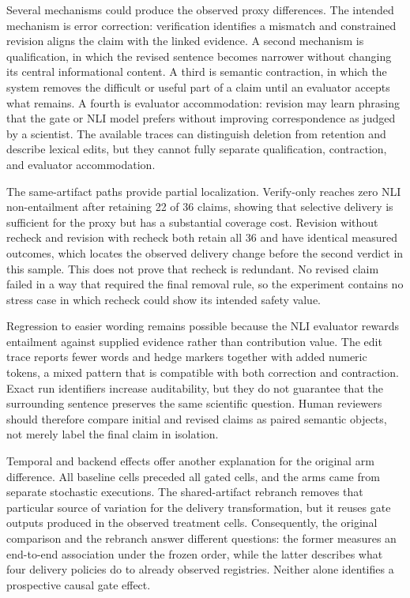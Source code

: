 \documentclass[11pt]{article}
\begin{document}
Several mechanisms could produce the observed proxy differences. The intended mechanism is error correction: verification identifies a mismatch and constrained revision aligns the claim with the linked evidence. A second mechanism is qualification, in which the revised sentence becomes narrower without changing its central informational content. A third is semantic contraction, in which the system removes the difficult or useful part of a claim until an evaluator accepts what remains. A fourth is evaluator accommodation: revision may learn phrasing that the gate or NLI model prefers without improving correspondence as judged by a scientist. The available traces can distinguish deletion from retention and describe lexical edits, but they cannot fully separate qualification, contraction, and evaluator accommodation.

The same-artifact paths provide partial localization. Verify-only reaches zero NLI non-entailment after retaining 22 of 36 claims, showing that selective delivery is sufficient for the proxy but has a substantial coverage cost. Revision without recheck and revision with recheck both retain all 36 and have identical measured outcomes, which locates the observed delivery change before the second verdict in this sample. This does not prove that recheck is redundant. No revised claim failed in a way that required the final removal rule, so the experiment contains no stress case in which recheck could show its intended safety value.

Regression to easier wording remains possible because the NLI evaluator rewards entailment against supplied evidence rather than contribution value. The edit trace reports fewer words and hedge markers together with added numeric tokens, a mixed pattern that is compatible with both correction and contraction. Exact run identifiers increase auditability, but they do not guarantee that the surrounding sentence preserves the same scientific question. Human reviewers should therefore compare initial and revised claims as paired semantic objects, not merely label the final claim in isolation.

Temporal and backend effects offer another explanation for the original arm difference. All baseline cells preceded all gated cells, and the arms came from separate stochastic executions. The shared-artifact rebranch removes that particular source of variation for the delivery transformation, but it reuses gate outputs produced in the observed treatment cells. Consequently, the original comparison and the rebranch answer different questions: the former measures an end-to-end association under the frozen order, while the latter describes what four delivery policies do to already observed registries. Neither alone identifies a prospective causal gate effect.
\end{document}
